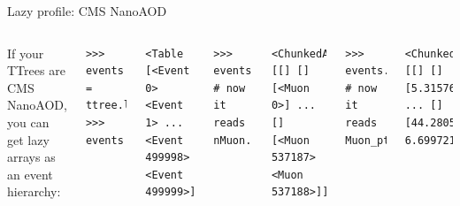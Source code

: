 \documentclass[aspectratio=169]{beamer}
\begin{document}
\begin{frame}[fragile]{Lazy profile: CMS NanoAOD}
\large
\vspace{0.5 cm}

\begin{columns}
If your TTrees are CMS NanoAOD, you can get lazy arrays as an event hierarchy:

\small
\begin{verbatim}
>>> events = ttree.lazyarrays(profile="cms.nanoaod")
>>> events
\end{verbatim}

\vspace{-0.6 cm}
\color{darkblue}\begin{verbatim}
<Table [<Event 0> <Event 1> ... <Event 499998> <Event 499999>]>
\end{verbatim}
\color{black}

\vspace{-0.6 cm}
\begin{verbatim}
>>> events.muons           # now it reads nMuon...
\end{verbatim}

\vspace{-0.6 cm}
\color{darkblue}\begin{verbatim}
<ChunkedArray [[] [] [<Muon 0>] ... [] [<Muon 537187> <Muon 537188>]]>
\end{verbatim}
\color{black}

\vspace{-0.6 cm}
\begin{verbatim}
>>> events.muons.pt        # now it reads Muon_pt...
\end{verbatim}

\vspace{-0.6 cm}
\color{darkblue}\begin{verbatim}
<ChunkedArray [[] [] [5.315762] ... [] [44.28051 6.6997213]]>
\end{verbatim}
\color{black}
\end{columns}
\end{frame}
\end{document}
